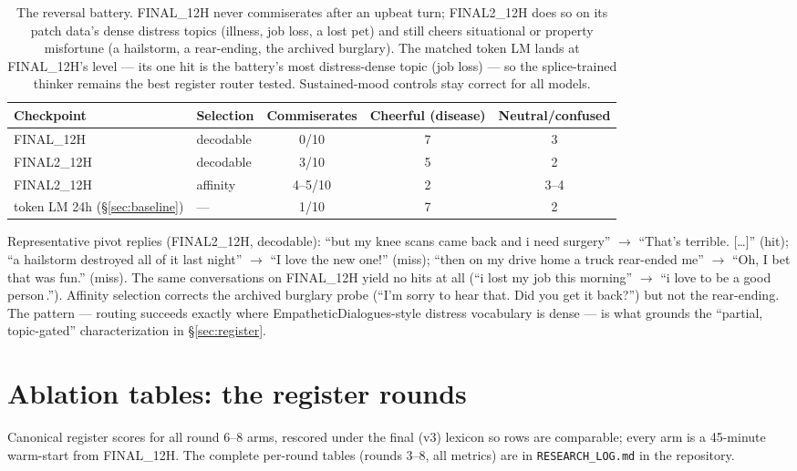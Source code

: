 \documentclass[11pt]{article}
\begin{document}
\begin{table}[h]
\centering
\small
\begin{tabular}{llccc}
\toprule
Checkpoint & Selection & Commiserates & Cheerful (disease) & Neutral/confused \\
\midrule
FINAL\_12H  & decodable & 0/10 & 7 & 3 \\
FINAL2\_12H & decodable & 3/10 & 5 & 2 \\
FINAL2\_12H & affinity  & 4--5/10 & 2 & 3--4 \\
token LM 24h (\S\ref{sec:baseline}) & --- & 1/10 & 7 & 2 \\
\bottomrule
\end{tabular}
\caption{The reversal battery. FINAL\_12H never commiserates after an upbeat
turn; FINAL2\_12H does so on its patch data's dense distress topics
(illness, job loss, a lost pet) and still cheers situational or property
misfortune (a hailstorm, a rear-ending, the archived burglary). The matched
token LM lands at FINAL\_12H's level --- its one hit is the battery's most
distress-dense topic (job loss) --- so the splice-trained thinker remains
the best register router tested. Sustained-mood controls stay correct for
all models.}
\label{tab:battery}
\end{table}

Representative pivot replies (FINAL2\_12H, decodable): ``but my knee scans
came back and i need surgery'' $\to$ ``That's terrible. [\dots]'' (hit);
``a hailstorm destroyed all of it last night'' $\to$ ``I love the new one!''
(miss); ``then on my drive home a truck rear-ended me'' $\to$ ``Oh, I bet
that was fun.'' (miss). The same conversations on FINAL\_12H yield no hits at
all (``i lost my job this morning'' $\to$ ``i love to be a good person\,.'').
Affinity selection corrects the archived burglary probe (``I'm sorry to hear
that. Did you get it back?'') but not the rear-ending. The pattern ---
routing succeeds exactly where EmpatheticDialogues-style distress vocabulary
is dense --- is what grounds the ``partial, topic-gated'' characterization in
\S\ref{sec:register}.

\section{Ablation tables: the register rounds}
\label{app:ablations}
Canonical register scores for all round 6--8 arms, rescored under the final
(v3) lexicon so rows are comparable; every arm is a 45-minute warm-start from
FINAL\_12H. The complete per-round tables (rounds 3--8, all metrics) are in
\texttt{RESEARCH\_LOG.md} in the repository.
\end{document}
